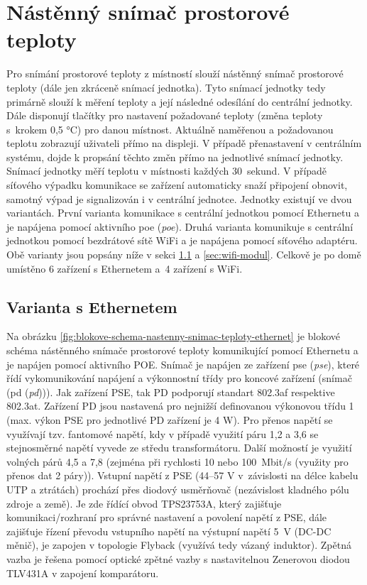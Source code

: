 \section{Nástěnný snímač prostorové teploty}

Pro snímání prostorové teploty z místností slouží nástěnný snímač prostorové teploty (dále jen zkráceně snímací jednotka). Tyto snímací jednotky tedy primárně slouží k měření teploty a její následné odesílání do centrální jednotky. Dále disponují tlačítky pro nastavení požadované teploty (změna teploty s~krokem 0,5 °C) pro danou místnost. Aktuálně naměřenou a požadovanou teplotu zobrazují uživateli přímo na displeji. V případě přenastavení v centrálním systému, dojde k propsání těchto změn přímo na jednotlivé snímací jednotky. Snímací jednotky měří teplotu v místnosti každých 30~sekund. V případě síťového výpadku komunikace se zařízení automaticky snaží připojení obnovit, samotný výpad je signalizován i v centrální jednotce. Jednotky existují ve dvou variantách. První varianta komunikace s centrální jednotkou pomocí Ethernetu a je napájena pomocí aktivního \acrshort{poe} (\textit{\acrlong{poe}}). Druhá varianta komunikuje s centrální jednotkou pomocí bezdrátové sítě WiFi a je napájena pomocí síťového adaptéru. Obě varianty jsou popsány níže v sekci \ref{sec:ethernet-modul} a \ref{sec:wifi-modul}. Celkově je po domě umístěno 6 zařízení s Ethernetem a~4 zařízení s WiFi.

\subsection{Varianta s Ethernetem}
\label{sec:ethernet-modul}

Na obrázku \ref{fig:blokove-schema-nastenny-snimac-teploty-ethernet} je blokové schéma nástěnného snímače prostorové teploty komunikující pomocí Ethernetu a je napájen pomocí aktivního POE. Snímač je napájen ze zařízení \acrshort{pse} (\textit{\acrlong{pse}}), které řídí vykomunikování napájení a výkonnostní třídy pro koncové zařízení (snímač (\acrshort{pd} (\textit{\acrlong{pd}}))). Jak zařízení PSE, tak PD podporují standart 802.3af respektive 802.3at. Zařízení PD jsou nastavená pro nejnižší definovanou výkonovou třídu 1 (max. výkon PSE pro jednotlivé PD zařízení je 4 W). Pro přenos napětí se využívají tzv. fantomové napětí, kdy v případě využití páru 1,2 a 3,6 se stejnosměrné napětí vyvede ze středu transformátoru. Další možností je využití volných párů 4,5 a 7,8 (zejména při rychlosti 10 nebo 100~Mbit/s (využity pro přenos dat 2 páry)). Vstupní napětí z PSE (44–57 V v~závislosti na délce kabelu UTP a ztrátách) prochází přes diodový usměrňovač (nezávislost kladného pólu zdroje a země). Je zde řídící obvod TPS23753A, který zajišťuje komunikaci/rozhraní pro správné nastavení a povolení napětí z PSE, dále zajišťuje řízení převodu vstupního napětí na výstupní napětí 5~V (DC-DC měnič), je zapojen v topologie Flyback (využívá tedy vázaný induktor). Zpětná vazba je řešena pomocí optické zpětné vazby s nastavitelnou Zenerovou diodou TLV431A v zapojení komparátoru. 

